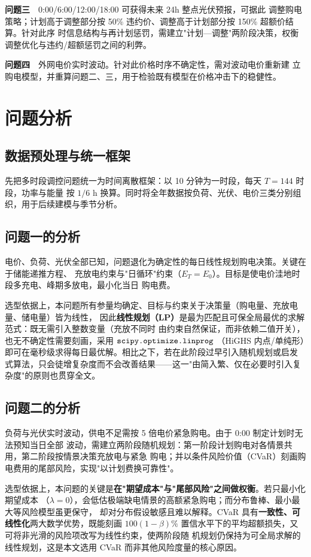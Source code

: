 \documentclass[withoutpreface]{cumcmthesis}
\begin{document}
\medskip\noindent\textbf{问题三}　0:00/6:00/12:00/18:00 可获得未来 24h 整点光伏预报，可据此
调整购电策略；计划高于调整部分按 50\% 违约价、调整高于计划部分按 150\% 超额价结算。针对此序
时信息结构与再计划惩罚，需建立"计划—调整"两阶段决策，权衡调整优化与违约/超额惩罚之间的利弊。

\medskip\noindent\textbf{问题四}　外网电价实时波动。针对此价格时序不确定性，需对波动电价重新建
立购电模型，并重算问题二、三，用于检验既有模型在价格冲击下的稳健性。

\section{问题分析}
\subsection{数据预处理与统一框架}
先把多时段调控问题统一为时间离散框架：以 10 分钟为一时段，每天 $T=144$ 时段，功率与能量
按 $1/6$ h 换算。同时将全年数据按负荷、光伏、电价三类分别组织，用于后续建模与季节分析。

\subsection{问题一的分析}
电价、负荷、光伏全部已知，问题退化为确定性的每日线性规划购电决策。关键在于储能递推方程、
充放电约束与"日循环"约束（$E_T=E_0$）。目标是使电价洼地时段多充电、峰期多放电，最小化当日
购电费。

选型依据上，本问题所有参量均确定、目标与约束关于决策量（购电量、充放电量、储电量）皆为线性，
因此\textbf{线性规划（LP）}是最为匹配且可保全局最优的求解范式：既无需引入整数变量（充放不同时
由约束自然保证，而非依赖二值开关），也无不确定性需要刻画，采用 $\verb|scipy.optimize.linprog|$
（HiGHS 内点/单纯形）即可在毫秒级求得每日最优解。相比之下，若在此阶段过早引入随机规划或启发
式算法，只会徒增复杂度而不会改善结果——这一"由简入繁、仅在必要时引入复杂度"的原则也贯穿全文。

\subsection{问题二的分析}
负荷与光伏实时波动，供电不足需按 5 倍电价紧急购电。由于 0:00 制定计划时无法预知当日全部
波动，需建立两阶段随机规划：第一阶段计划购电对各情景共用，第二阶段按情景决策充放电与紧急
购电；并以条件风险价值（CVaR）刻画购电费用的尾部风险，实现"以计划费换可靠性"。

选型依据上，本问题的关键是\textbf{在"期望成本"与"尾部风险"之间做权衡}。若只最小化期望成本
（$\lambda=0$），会低估极端缺电情景的高额紧急购电；而分布鲁棒、最小最大等风险模型虽更保守，
却对分布假设敏感且难以解释。CVaR 具有\textbf{一致性、可线性化}两大数学优势，既能刻画
$100(1-\beta)\%$ 置信水平下的平均超额损失，又可将非光滑的风险项改写为线性约束，使两阶段随
机规划仍保持为可全局求解的线性规划，这是本文选用 CVaR 而非其他风险度量的核心原因。
\end{document}

